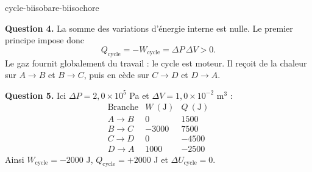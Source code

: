 \begin{exo}{cycle-biisobare-biisochore}
\begin{solution}
\textbf{Question 4.} La somme des variations d'énergie interne est nulle. Le premier principe impose donc
\[
Q_{\mathrm{cycle}}=-W_{\mathrm{cycle}}=\Delta P\,\Delta V>0.
\]
Le gaz fournit globalement du travail : le cycle est moteur. Il reçoit de la chaleur sur $A\to B$ et $B\to C$, puis en cède sur $C\to D$ et $D\to A$.

\textbf{Question 5.} Ici $\Delta P=2{,}0\times10^5$ Pa et $\Delta V=1{,}0\times10^{-2}$ m$^3$ :
\[
\begin{array}{c|r|r}
\text{Branche} & W\ (\mathrm J) & Q\ (\mathrm J)\\ \hline
A\to B & 0 & 1500\\
B\to C & -3000 & 7500\\
C\to D & 0 & -4500\\
D\to A & 1000 & -2500
\end{array}
\]
Ainsi $W_{\mathrm{cycle}}=-2000$ J, $Q_{\mathrm{cycle}}=+2000$ J et $\Delta U_{\mathrm{cycle}}=0$.
\end{solution}
\end{exo}

